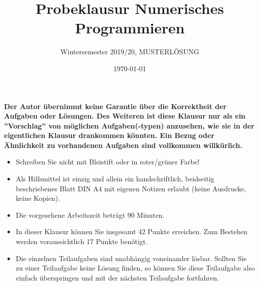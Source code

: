 \documentclass{scrartcl}
\begin{document}
\title{Probeklausur Numerisches Programmieren}
\subtitle{Wintersemester 2019/20, MUSTERLÖSUNG}
\author{\npauthor{}}
\date{\today}
\maketitle

\noindent\textbf{Der Autor übernimmt keine Garantie über die Korrektheit der Aufgaben oder Lösungen. \n Des Weiteren ist diese Klausur nur als ein ''Vorschlag'' von möglichen Aufgaben(-typen) anzusehen, wie sie in der eigentlichen Klausur drankommen könnten. Ein Bezug oder Ähnlichkeit zu vorhandenen Aufgaben sind vollkommen willkürlich.}
\sbreak

\begin{itemize}
	\item Schreiben Sie nicht mit Bleistift oder in roter/grüner Farbe!
	\item Als Hilfsmittel ist einzig und allein ein handschriftlich, beidseitig beschriebenes Blatt DIN A4 mit eigenen Notizen erlaubt (keine Ausdrucke, keine Kopien).
	\item Die vorgesehene Arbeitszeit beträgt 90 Minuten.
	\item In dieser Klausur können Sie insgesamt 42 Punkte erreichen. Zum Bestehen werden voraussichtlich 17 Punkte benötigt.
	\item Die einzelnen Teilaufgaben sind unabhängig voneinander lösbar.
	Sollten Sie zu einer Teilaufgabe keine Lösung finden, so können Sie diese Teilaufgabe also einfach überspringen und mit der nächsten Teilaufgabe fortfahren.
\end{itemize}




\end{document}

